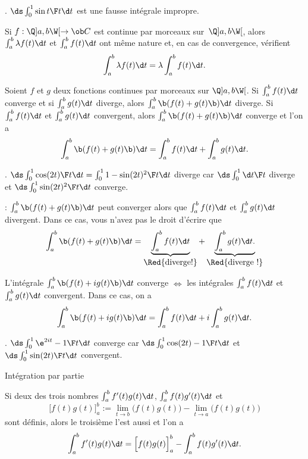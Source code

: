 \Exemple. $\ds \int_0^1{\sin t\F t}\d t$ est une fausse intégrale impropre. 
\bigskip


Si $f:\Q]a,b\W[\to\ob C$ est continue par morceaux sur~$\Q]a,b\W[$, alors $\int_a^b \lambda f(t)\d t$ et $\int_a^b f(t)\d t$ ont même nature et, 
en cas de convergence, vérifient 
$$
\int_a^b \lambda f(t)\d t=\lambda \int_a^b f(t)\d t. 
$$


\Propriete [$(a,b)\in\overline{\ob R}^2$] 
Soient $f$ et $g$ deux fonctions continues par morceaux sur $\Q]a,b\W[$. \pn
Si $\int_a^bf(t)\d t$ converge et si $\int_a^bg(t)\d t$ diverge, alors $\int_a^b\b(f(t)+g(t)\b)\d t$ diverge. \medskip\noindent
Si $\int_a^bf(t)\d t$ et $\int_a^bg(t)\d t$ convergent, alors $\int_a^b\b(f(t)+g(t)\b)\d t$ converge et l'on a 
\Equation [\bf addition]
$$
\int_a^b\b(f(t)+g(t)\b)\d t=\int_a^bf(t)\d t+\int_a^bg(t)\d t. 
$$

\Exemple. $\ds\int_0^1{\cos(2t)\F t}\d t=\int_0^1{1-\sin(2t)^2\F t}\d t$ diverge car $\ds\int_0^1{\d t\F t}$ diverge et $\ds\int_0^1{\sin(2t)^2\F t}\d t$ converge. 
\bigskip

\Remarque : $\int_a^b\b(f(t)+g(t)\b)\d t$ peut converger alors que $\int_a^bf(t)\d t$ et $\int_a^bg(t)\d t$ divergent. Dans ce cas, vous n'avez pas le droit d'écrire que 
$$
\int_a^b\b(f(t)+g(t)\b)\d t=\underbrace{\int_a^bf(t)\d t}_{\mbox{\Red{diverge!}}}
+\underbrace{\int_a^bg(t)\d t. }_{\mbox{\Red{diverge !}}}
$$

%

L'intégrale $\int_a^b\b(f(t)+ig(t)\b)\d t$ converge $\Leftrightarrow$ les intégrales $\int_a^bf(t)\d t$ et $\int_a^bg(t)\d t$ convergent. 
Dans ce cas, on a 
$$
\int_a^b\b(f(t)+ig(t)\b)\d t=\int_a^bf(t)\d t+i\int_a^bg(t)\d t. 
$$

\Exemple. $\ds\int_0^1{\e^{2it}-1\F t}\d t$ converge car $\ds\int_0^1{\cos(2t)-1\F t}\d t$ et $\ds\int_0^1{\sin(2t)\F t}\d t$ convergent. 
\bigskip

\Concept Intégration par partie

Si deux des trois nombres $\int_a^bf'(t)g(t)\d t$, $\int_a^bf(t)g'(t)\d t$ et 
$$
\Big[f(t)g(t)\Big]_a^b:=\lim\limits_{t\to b}\Big(f(t)g(t)\Big)-\lim\limits_{t\to a}\Big(f(t)g(t)\Big)
$$
sont définis, alors le troisième l'est aussi et l'on a 
$$
\int_a^bf'(t)g(t)\d t=\Big[f(t)g(t)\Big]_a^b-\int_a^bf(t)g'(t)\d t. 
$$



